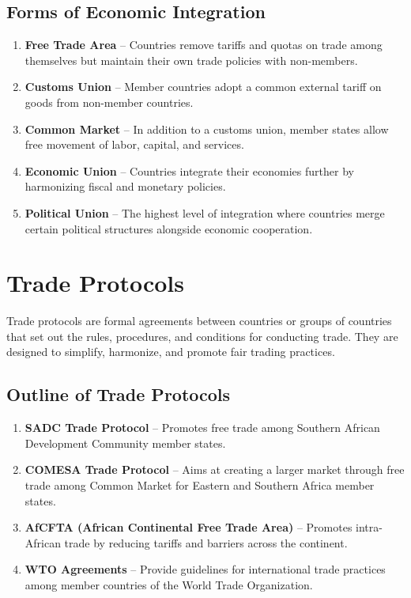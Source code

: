 \documentclass[14pt,a4paper, openany]{book}
\begin{document}
\subsection{Forms of Economic Integration}
\begin{enumerate}
	\item \textbf{Free Trade Area} – Countries remove tariffs and quotas on trade among themselves but maintain their own trade policies with non-members.
	\item \textbf{Customs Union} – Member countries adopt a common external tariff on goods from non-member countries.
	\item \textbf{Common Market} – In addition to a customs union, member states allow free movement of labor, capital, and services.
	\item \textbf{Economic Union} – Countries integrate their economies further by harmonizing fiscal and monetary policies.
	\item \textbf{Political Union} – The highest level of integration where countries merge certain political structures alongside economic cooperation.
\end{enumerate}

\section{Trade Protocols}
Trade protocols are formal agreements between countries or groups of countries
that set out the rules, procedures, and conditions for conducting trade.
They are designed to simplify, harmonize, and promote fair trading practices.

\subsection{Outline of Trade Protocols}
\begin{enumerate}
	\item \textbf{SADC Trade Protocol} – Promotes free trade among Southern African Development Community member states.
	\item \textbf{COMESA Trade Protocol} – Aims at creating a larger market through free trade among Common Market for Eastern and Southern Africa member states.
	\item \textbf{AfCFTA (African Continental Free Trade Area)} – Promotes intra-African trade by reducing tariffs and barriers across the continent.
	\item \textbf{WTO Agreements} – Provide guidelines for international trade practices among member countries of the World Trade Organization.
\end{enumerate}
\end{document}
